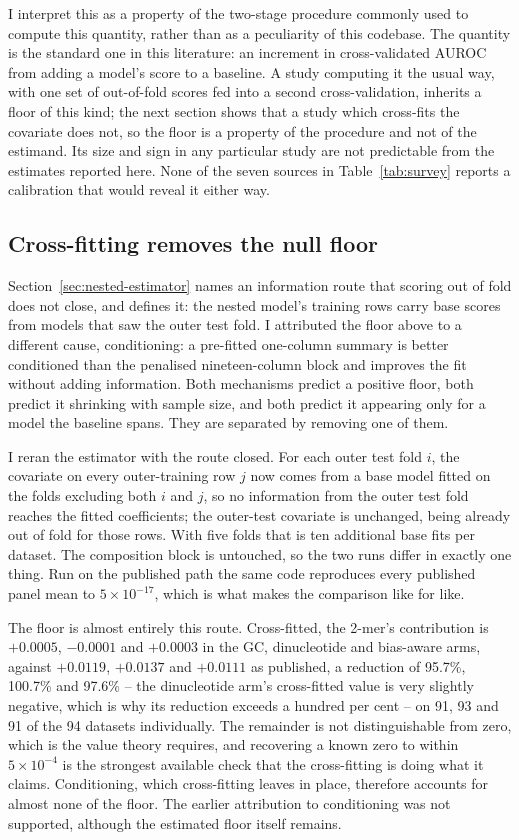 I interpret this as a property of the two-stage procedure commonly used to compute this quantity, rather than
as a peculiarity of this codebase. The quantity is the standard one in this literature: an increment
in cross-validated AUROC from adding a model's score to a baseline. A study computing it the
usual way, with one set of out-of-fold scores fed into a second cross-validation, inherits a
floor of this kind; the next section shows that a study which cross-fits the covariate does not,
so the floor is a property of the procedure and not of the estimand. Its size and sign in
any particular study are not predictable from the estimates reported here. None of the seven sources in
Table~\ref{tab:survey} reports a calibration that would reveal it either way.

\subsection{Cross-fitting removes the null floor}
\label{sec:crossfit}

Section~\ref{sec:nested-estimator} names an information route that scoring out of fold does not close,
and defines it: the nested model's training rows carry base scores from models that saw the
outer test fold. I attributed the floor above to a
different cause, conditioning: a pre-fitted one-column summary is better conditioned than the
penalised nineteen-column block and improves the fit without adding information. Both mechanisms
predict a positive floor, both predict it shrinking with sample size, and both predict it
appearing only for a model the baseline spans. They are separated by removing one of them.

I reran the estimator with the route closed. For each outer test fold $i$, the covariate on
every outer-training row $j$ now comes from a base model fitted on the folds excluding both $i$
and $j$, so no information from the outer test fold reaches the fitted coefficients; the
outer-test covariate is unchanged, being already out of fold for those rows. With five folds
that is ten additional base fits per dataset. The composition block is untouched, so the two
runs differ in exactly one thing. Run on the published path the same code reproduces every
published panel mean to $5\times10^{-17}$, which is what makes the comparison like for like.

The floor is almost entirely this route. Cross-fitted, the 2-mer's contribution is $+0.0005$,
$-0.0001$ and $+0.0003$ in the GC, dinucleotide and bias-aware arms, against $+0.0119$,
$+0.0137$ and $+0.0111$ as published, a reduction of 95.7\%, 100.7\% and 97.6\% -- the
dinucleotide arm's cross-fitted value is very slightly negative, which is why its reduction
exceeds a hundred per cent -- on 91, 93 and 91 of the 94 datasets individually. The remainder is not distinguishable from zero, which is the value
theory requires, and recovering a known zero to within $5\times10^{-4}$ is the strongest
available check that the cross-fitting is doing what it claims. Conditioning, which cross-fitting
leaves in place, therefore accounts for almost none of the floor. The earlier attribution to
conditioning was not supported, although the estimated floor itself remains.

